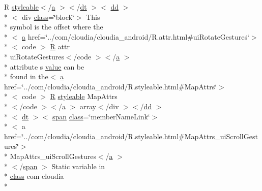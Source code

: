 \begin{DoxyCompactItemize}
 R \hyperlink{index-17_8html_ae6c9bf1e41380184b4b665ca9ab6ba0a}{styleable}$<$/\hyperlink{style_8css_a5e8981582017bb8b84c21f148345d1f7}{a} $>$$<$/\hyperlink{stylesheet_8css_a107565fb4039d33b041380d6e0ea1d80}{dt} $>$$<$ \hyperlink{stylesheet_8css_a47f4718a86835a7771ec592ece845221}{dd} $>$\\*
$<$ div \hyperlink{_tools_8html_acf06f836132665ba8114f5a414c2403f}{class}=\char`\"{}block\char`\"{}$>$ This \\*
symbol is the offset where the\\*
$<$ \hyperlink{style_8css_a5e8981582017bb8b84c21f148345d1f7}{a} href=\char`\"{}../com/cloudia/cloudia\-\_\-android/R.\-attr.\-html\#ui\-Rotate\-Gestures\char`\"{}$>$\\*
$<$ code $>$ \hyperlink{index-16_8html_a31e8fe59be5c20ce90a0090e28a0c1fe}{R} attr \\*
ui\-Rotate\-Gestures$<$/code $>$$<$/\hyperlink{style_8css_a5e8981582017bb8b84c21f148345d1f7}{a} $>$\\*
 attribute s \hyperlink{_my_s_q_l_connector_8measure_8html_afcc7a4b78ecd8fa7e713f8cfa0f51017}{value} can be \\*
found in the$<$ \hyperlink{style_8css_a5e8981582017bb8b84c21f148345d1f7}{a} href=\char`\"{}../com/cloudia/cloudia\-\_\-android/R.\-styleable.\-html\#Map\-Attrs\char`\"{}$>$\\*
$<$ code $>$ \hyperlink{index-16_8html_a31e8fe59be5c20ce90a0090e28a0c1fe}{R} \hyperlink{index-17_8html_ae6c9bf1e41380184b4b665ca9ab6ba0a}{styleable} Map\-Attrs\\*
$<$/code $>$$<$/\hyperlink{style_8css_a5e8981582017bb8b84c21f148345d1f7}{a} $>$ array$<$/div $>$$<$/\hyperlink{stylesheet_8css_a47f4718a86835a7771ec592ece845221}{dd} $>$\\*
$<$ \hyperlink{stylesheet_8css_a107565fb4039d33b041380d6e0ea1d80}{dt} $>$$<$ \hyperlink{stylesheet_8css_a8343996ebcf16220b04e54659aac31cc}{span} \hyperlink{_tools_8html_acf06f836132665ba8114f5a414c2403f}{class}=\char`\"{}member\-Name\-Link\char`\"{}$>$\\*
$<$ a href=\char`\"{}../com/cloudia/cloudia\-\_\-android/R.\-styleable.\-html\#Map\-Attrs\-\_\-ui\-Scroll\-Gestures\char`\"{}$>$\\*
 Map\-Attrs\-\_\-ui\-Scroll\-Gestures$<$/\hyperlink{style_8css_a5e8981582017bb8b84c21f148345d1f7}{a} $>$\\*
$<$/\hyperlink{stylesheet_8css_a8343996ebcf16220b04e54659aac31cc}{span} $>$ Static variable in \\*
\hyperlink{_tools_8html_acf06f836132665ba8114f5a414c2403f}{class} com cloudia \\*

\end{DoxyCompactItemize}
